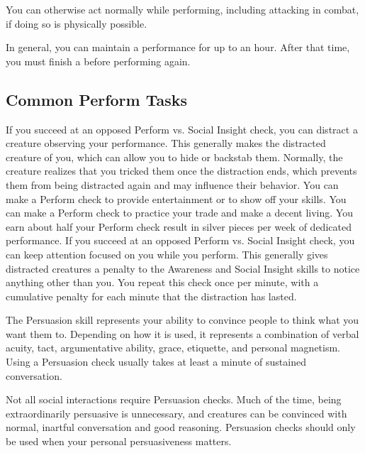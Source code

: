     You can otherwise act normally while performing, including attacking in combat, if doing so is physically possible.

    In general, you can maintain a performance for up to an hour.
    After that time, you must finish a  before performing again.

  \subsection{Common Perform Tasks}
     If you succeed at an opposed Perform vs. Social Insight check, you can distract a creature observing your performance.
    This generally makes the distracted creature \briefly \partiallyunaware of you, which can allow you to hide or backstab them.
    Normally, the creature realizes that you tricked them once the distraction ends, which prevents them from being distracted again and may influence their behavior.
     You can make a Perform check to provide entertainment or to show off your skills.
     You can make a Perform check to practice your trade and make a decent living.
    You earn about half your Perform check result in silver pieces per week of dedicated performance.
     If you succeed at an opposed Perform vs. Social Insight check, you can keep attention focused on you while you perform.
    This generally gives distracted creatures a  penalty to the Awareness and Social Insight skills to notice anything other than you.
    You repeat this check once per minute, with a cumulative  penalty for each minute that the distraction has lasted.

\newpage
{}
  The Persuasion skill represents your ability to convince people to think what you want them to.
  Depending on how it is used, it represents a combination of verbal acuity, tact, argumentative ability, grace, etiquette, and personal magnetism.
  Using a Persuasion check usually takes at least a minute of sustained conversation.

  Not all social interactions require Persuasion checks. Much of the time, being extraordinarily persuasive is unnecessary, and creatures can be convinced with normal, inartful conversation and good reasoning. Persuasion checks should only be used when your personal persuasiveness matters.

